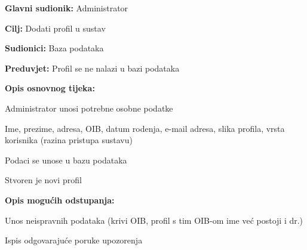		   	\noindent {}
				\begin{packed_item}
						
						\item \textbf{Glavni sudionik: }Administrator
						\item  \textbf{Cilj:} Dodati profil u sustav
						\item  \textbf{Sudionici:} Baza podataka
						\item  \textbf{Preduvjet:} Profil se ne nalazi u bazi podataka
						\item  \textbf{Opis osnovnog tijeka:}
						
						\item[] \begin{packed_enum}
							
							\item Administrator unosi potrebne osobne podatke
							\begin{packed_enum}
								\item Ime, prezime, adresa, OIB, datum rodenja, e-mail adresa, slika profila, vrsta korisnika (razina pristupa sustavu)
							\end{packed_enum}
							\item Podaci se unose u bazu podataka
							\item Stvoren je novi profil
							
						\end{packed_enum}
						
						\item  \textbf{Opis mogućih odstupanja:}
						
						\item[] \begin{packed_item}
							
							\item[1.a] Unos neispravnih podataka (krivi OIB, profil s tim OIB-om ime već postoji i dr.)
							\item[] \begin{packed_enum}
								
								\item Ispis odgovarajuće poruke upozorenja
								
							\end{packed_enum}
							
						\end{packed_item}
					\end{packed_item}
				
